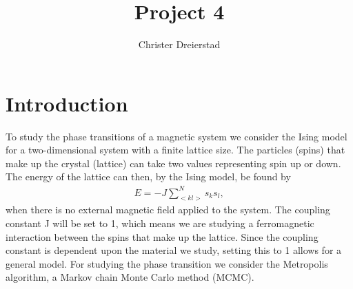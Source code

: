 \documentclass{emulateapj}
\begin{document}
\title{Project 4}

\author{Christer Dreierstad}





\begin{abstract}

\end{abstract}

\section{Introduction}
\label{sec:introduction}
To study the phase transitions of a magnetic system we consider the Ising model for a two-dimensional system with a finite lattice size. The particles (spins) that make up the crystal (lattice) can take two values representing spin up or down. The energy of the lattice can then, by the Ising model, be found by
%
\begin{gather*}
    E = -J\sum_{< kl >}^N s_k s_l,
\end{gather*}
%
when there is no external magnetic field applied to the system. The coupling constant J will be set to 1, which means we are studying a ferromagnetic interaction between the spins that make up the lattice. Since the coupling constant is dependent upon the material we study, setting this to 1 allows for a general model. For studying the phase transition we consider the  Metropolis algorithm, a Markov chain Monte Carlo method (MCMC). 
\end{document}
